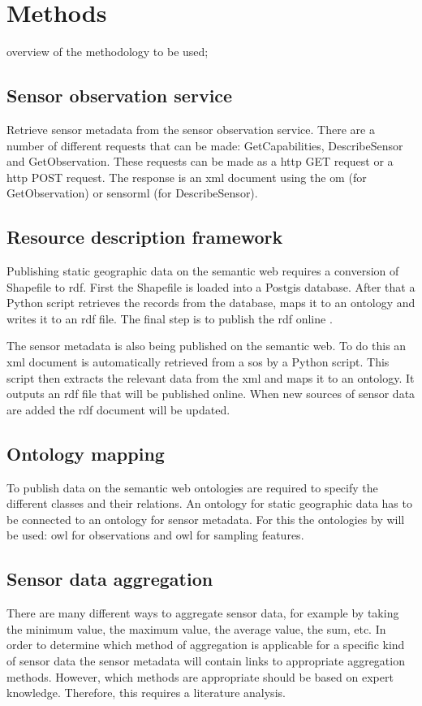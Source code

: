 \chapter{Methods}
\label{chap:methods}

overview of the methodology to be used;

\section{Sensor observation service}
Retrieve sensor metadata from the sensor observation service. There are a number of different requests that can be made: GetCapabilities, DescribeSensor and GetObservation. These requests can be made as a \ac{http} GET request or a \ac{http} POST request. The response is an \ac{xml} document using the \ac{om} (for GetObservation) or \ac{sensorml} (for DescribeSensor).

\section{Resource description framework}
Publishing static geographic data on the semantic web requires a conversion of Shapefile to \ac{rdf}. First the Shapefile is loaded into a Postgis database. After that a Python script retrieves the records from the database, maps it to an ontology and writes it to an \ac{rdf} file. The final step is to publish the \ac{rdf} online \citep{LD:Missier}. 

The sensor metadata is also being published on the semantic web. To do this an \ac{xml} document is automatically retrieved from a \ac{sos} by a Python script. This script then extracts the relevant data from the \ac{xml} and maps it to an ontology. It outputs an \ac{rdf} file that will be published online. When new sources of sensor data are added the \ac{rdf} document will be updated.   

\section{Ontology mapping}
To publish data on the semantic web ontologies are required to specify the different classes and their relations. An ontology for static geographic data has to be connected to an ontology for sensor metadata. For this the ontologies by \cite{SSW:Cox4} will be used: \ac{owl} for observations and \ac{owl} for sampling features.  

\section{Sensor data aggregation}
There are many different ways to aggregate sensor data, for example by taking the minimum value, the maximum value, the average value, the sum, etc. In order to determine which method of aggregation is applicable for a specific kind of sensor data the sensor metadata will contain links to appropriate aggregation methods. However, which methods are appropriate should be based on expert knowledge. Therefore, this requires a literature analysis. 


